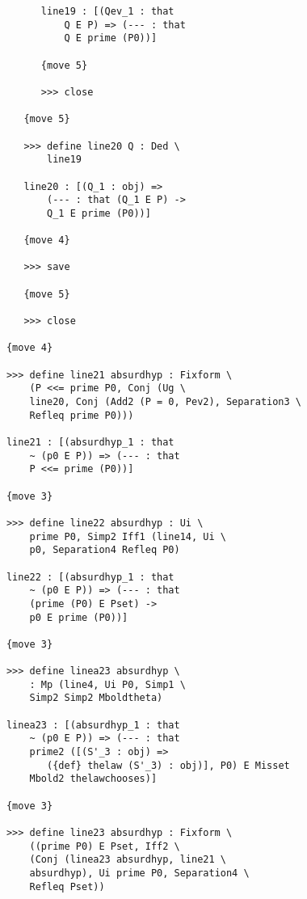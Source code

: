 \documentclass[12pt]{article}
\begin{document}
\begin{verbatim}
                  line19 : [(Qev_1 : that 
                      Q E P) => (--- : that 
                      Q E prime (P0))]

                  {move 5}

                  >>> close

               {move 5}

               >>> define line20 Q : Ded \
                   line19

               line20 : [(Q_1 : obj) => 
                   (--- : that (Q_1 E P) -> 
                   Q_1 E prime (P0))]

               {move 4}

               >>> save

               {move 5}

               >>> close

            {move 4}

            >>> define line21 absurdhyp : Fixform \
                (P <<= prime P0, Conj (Ug \
                line20, Conj (Add2 (P = 0, Pev2), Separation3 \
                Refleq prime P0)))

            line21 : [(absurdhyp_1 : that 
                ~ (p0 E P)) => (--- : that 
                P <<= prime (P0))]

            {move 3}

            >>> define line22 absurdhyp : Ui \
                prime P0, Simp2 Iff1 (line14, Ui \
                p0, Separation4 Refleq P0)

            line22 : [(absurdhyp_1 : that 
                ~ (p0 E P)) => (--- : that 
                (prime (P0) E Pset) -> 
                p0 E prime (P0))]

            {move 3}

            >>> define linea23 absurdhyp \
                : Mp (line4, Ui P0, Simp1 \
                Simp2 Simp2 Mboldtheta)

            linea23 : [(absurdhyp_1 : that 
                ~ (p0 E P)) => (--- : that 
                prime2 ([(S'_3 : obj) => 
                   ({def} thelaw (S'_3) : obj)], P0) E Misset 
                Mbold2 thelawchooses)]

            {move 3}

            >>> define line23 absurdhyp : Fixform \
                ((prime P0) E Pset, Iff2 \
                (Conj (linea23 absurdhyp, line21 \
                absurdhyp), Ui prime P0, Separation4 \
                Refleq Pset))


\end{verbatim}
\end{document}
